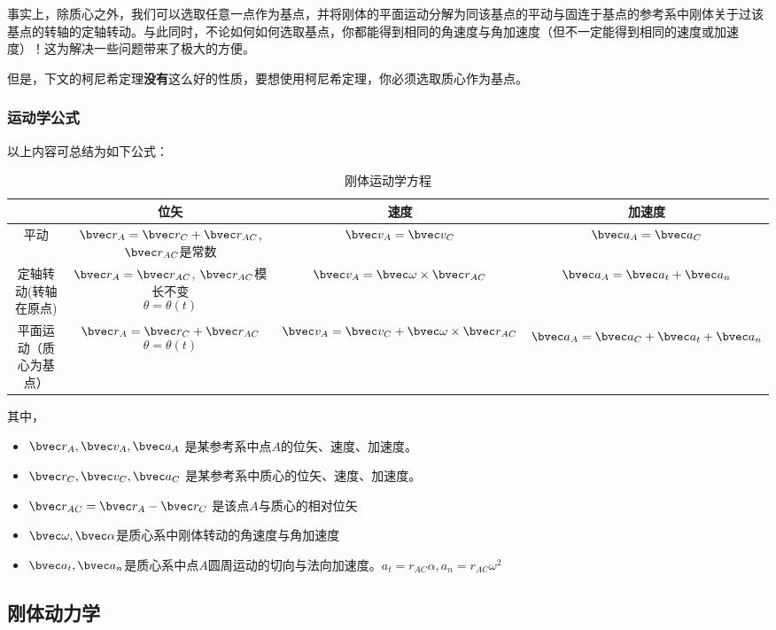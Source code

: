 事实上，除质心之外，我们可以选取任意一点作为基点，并将刚体的平面运动分解为同该基点的平动与固连于基点的参考系中刚体关于过该基点的转轴的定轴转动。与此同时，不论如何如何选取基点，你都能得到相同的角速度与角加速度（但不一定能得到相同的速度或加速度）！这为解决一些问题带来了极大的方便。

但是，下文的柯尼希定理\textbf{没有}这么好的性质，要想使用柯尼希定理，你必须选取质心作为基点。

\subsubsection{运动学公式}
以上内容可总结为如下公式：
\begin{table}[ht]
\centering
\caption{刚体运动学方程}\label{RGAB_tab2}
\begin{tabular}{|c|c|c|c|}
\hline
 & 位矢 & 速度  & 加速度 \\
\hline
平动 & $\bvec r_A = \bvec r_C + \bvec r_{AC}$, $\bvec r_{AC}$是常数 & $\bvec v_A = \bvec v_C$ & $\bvec a_A = \bvec a_C$ \\
\hline
定轴转动(转轴在原点) & $\bvec r_A = \bvec r_{AC}$, $\bvec r_{AC}$模长不变 $$\theta =\theta (t) $$ & $\bvec v_A = \bvec \omega \times \bvec r_{AC}$ & $\bvec a_A = \bvec a_t + \bvec a_n$\\
\hline
平面运动（质心为基点） & $\bvec r_A = \bvec r_C + \bvec r_{AC}$ $$\theta =\theta (t) $$& $\bvec v_A = \bvec v_C + \bvec \omega \times \bvec r_{AC}$ & $$\bvec a_A = \bvec a_C + \bvec a_t + \bvec a_n$$ \\
\hline
\end{tabular}
\end{table}
其中，
\begin{itemize}
\item $\bvec r_A, \bvec v_A, \bvec a_A$ 是某参考系中点$A$的位矢、速度、加速度。
\item $\bvec r_C, \bvec v_C, \bvec a_C$ 是某参考系中质心的位矢、速度、加速度。
\item $\bvec r_{AC} = \bvec r_A -\bvec r_C $ 是该点$A$与质心的相对位矢
\item $\bvec \omega, \bvec \alpha$是质心系中刚体转动的角速度与角加速度 
\item $\bvec a_t, \bvec a_n$是质心系中点$A$圆周运动的切向与法向加速度。$a_t=r_{AC}\alpha, a_n=r_{AC}\omega^2$
 
\end{itemize}

\subsection{刚体动力学}
